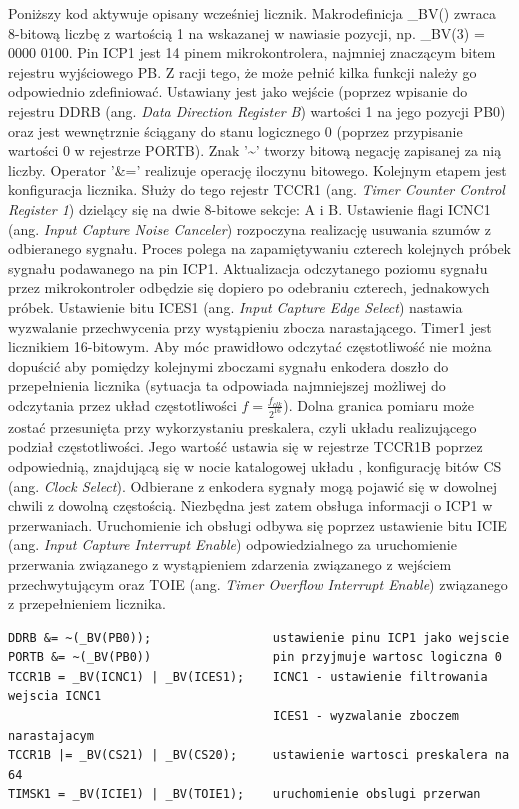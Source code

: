   Poniższy kod aktywuje opisany wcześniej licznik. Makrodefinicja \_BV() zwraca 8-bitową liczbę z wartością 1 na wskazanej w nawiasie pozycji, np. \_BV(3) = 0000 0100. Pin ICP1 jest 14 pinem mikrokontrolera, najmniej znaczącym bitem rejestru wyjściowego PB. Z racji tego, że może pełnić kilka funkcji należy go odpowiednio zdefiniować. Ustawiany jest jako wejście (poprzez wpisanie do rejestru DDRB (ang. \textit{Data Direction Register B}) wartości 1 na jego pozycji PB0) oraz jest wewnętrznie ściągany do stanu logicznego 0 (poprzez przypisanie wartości 0 w rejestrze PORTB). Znak '\textasciitilde' tworzy bitową negację zapisanej za nią liczby. Operator '\&=' realizuje operację iloczynu bitowego. Kolejnym etapem jest konfiguracja licznika. Służy do tego rejestr TCCR1 (ang. \textit{Timer Counter Control Register 1}) dzielący się na dwie 8-bitowe sekcje: A i B. Ustawienie flagi ICNC1 (ang. \textit{Input Capture Noise Canceler}) rozpoczyna realizację usuwania szumów z odbieranego sygnału. Proces polega na zapamiętywaniu czterech kolejnych próbek sygnału podawanego na pin ICP1. Aktualizacja odczytanego poziomu sygnału przez mikrokontroler odbędzie się dopiero po odebraniu czterech, jednakowych próbek. Ustawienie bitu ICES1 (ang. \textit{Input Capture Edge Select}) nastawia wyzwalanie przechwycenia przy wystąpieniu zbocza narastającego. Timer1 jest licznikiem 16-bitowym. Aby móc prawidłowo odczytać częstotliwość nie można dopuścić aby pomiędzy kolejnymi zboczami sygnału enkodera doszło do przepełnienia licznika (sytuacja ta odpowiada najmniejszej możliwej do odczytania przez układ częstotliwości $f=\frac{f_{clk}}{2^{16}}$).
Dolna granica pomiaru może zostać przesunięta przy wykorzystaniu preskalera, czyli układu realizującego podział częstotliwości. Jego wartość ustawia się w rejestrze TCCR1B poprzez odpowiednią, znajdującą się w nocie katalogowej układu \cite{nota}, konfigurację bitów CS (ang. \textit{Clock Select}). Odbierane z enkodera sygnały mogą pojawić się w dowolnej chwili z dowolną częstością. Niezbędna jest zatem obsługa informacji o ICP1 w przerwaniach. Uruchomienie ich obsługi odbywa się poprzez ustawienie bitu ICIE (ang. \textit{Input Capture Interrupt Enable}) odpowiedzialnego za uruchomienie przerwania związanego z wystąpieniem zdarzenia związanego z wejściem przechwytującym oraz TOIE (ang. \textit{Timer Overflow Interrupt Enable}) związanego z przepełnieniem licznika.
\begin{lstlisting}[caption=Inicjalizacja licznika Timer1 jako układu odmierzącego czas pomiędzy kolejnymi zboczami sygnału podawanego na wejście ICP1]
DDRB &= ~(_BV(PB0));                 ustawienie pinu ICP1 jako wejscie 
PORTB &= ~(_BV(PB0))                 pin przyjmuje wartosc logiczna 0
TCCR1B = _BV(ICNC1) | _BV(ICES1);    ICNC1 - ustawienie filtrowania wejscia ICNC1
                                     ICES1 - wyzwalanie zboczem narastajacym 
TCCR1B |= _BV(CS21) | _BV(CS20);     ustawienie wartosci preskalera na 64
TIMSK1 = _BV(ICIE1) | _BV(TOIE1);    uruchomienie obslugi przerwan
\end{lstlisting}

